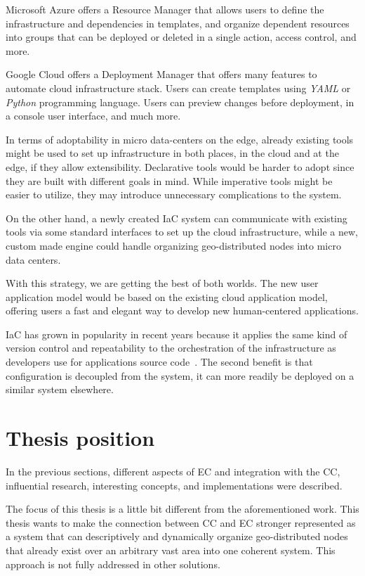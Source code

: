 {Microsoft Azure offers a Resource Manager that allows users to define the infrastructure and dependencies in templates, and organize dependent resources into groups that can be deployed or deleted in a single action, access control, and more.

Google Cloud offers a Deployment Manager that offers many features to automate cloud infrastructure stack. Users can create templates using \emph{YAML} or \emph{Python} programming language. Users can preview changes before deployment, in a console user interface, and much more.

In terms of adoptability in micro data-centers on the edge, already existing tools might be used to set up infrastructure in both places, in the cloud and at the edge, if they allow extensibility. Declarative tools would be harder to adopt since they are built with different goals in mind. While imperative tools might be easier to utilize, they may introduce unnecessary complications to the system.

On the other hand, a newly created IaC system can communicate with existing tools via some standard interfaces to set up the cloud infrastructure, while a new, custom made engine could handle organizing geo-distributed nodes into micro data centers.

With this strategy, we are getting the best of both worlds. The new user application model would be based on the existing cloud application model, offering users a fast and elegant way to develop new human-centered applications.

IaC has grown in popularity in recent years because it applies the same kind of version control and repeatability to the orchestration of the infrastructure as developers use for applications source code~\cite{ArtacBNGT17}. The second benefit is that configuration is decoupled from the system, it can more readily be deployed on a similar system elsewhere.
}
%
%
\section{Thesis position}\label{sec:thesis_position}
%
In the previous sections, different aspects of EC and integration with the CC, influential research, interesting concepts, and implementations were described.

The focus of this thesis is a little bit different from the aforementioned work. This thesis wants to make the connection between CC and EC stronger represented as a system that can descriptively and dynamically organize geo-distributed nodes that already exist over an arbitrary vast area into one coherent system. This approach is not fully addressed in other solutions. 

